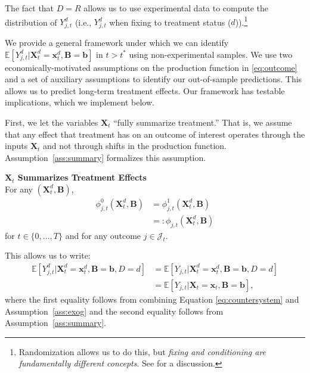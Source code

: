 The fact that $D = R$ allows us to use experimental data to compute the distribution of $Y_{j,t}^d$ (i.e., $Y_{j,t}^d$ when fixing to treatment status ($d$)).\footnote{Randomization allows us to do this, but \textit{fixing and conditioning are fundamentally different concepts}. See \citet{Heckman_Pinto_2015_EconometTheory} for a discussion.}

We provide a general framework under which we can identify $\mathbb{E} \left[ Y_{j,t}^d | \bm{X}_{t}^d = \bm{x}_t^d, \bm{B} = \bm{b}  \right]$ in $t > t^*$ using non-experimental samples. We use two economically-motivated assumptions on the production function in \eqref{eq:outcome} and a set of auxiliary assumptions to identify our out-of-sample predictions. This allows us to predict long-term treatment effects. Our framework has testable implications, which we implement below.

First, we let the variables $\bm{X}_{t}$ ``fully summarize treatment.'' That is, we assume that any effect that treatment has on an outcome of interest operates through the inputs $\bm{X}_{t}$ and not through shifts in the production function. Assumption~\ref{ass:summary} formalizes this assumption.

\begin{assumption} \label{ass:summary} \textbf{$\bm{X}_{t}$ Summarizes Treatment Effects}\\
For any $\left( \bm{X}_{t}^d, \bm{B} \right)$,
\begin{align}
\phi_{j,t}^0 \left( \bm{X}_{t}^d, \bm{B} \right) &= \phi_{j,t}^1 \left( \bm{X}_{t}^d, \bm{B} \right) \\   \nonumber
                                                                     &=: \phi_{j,t} \left( \bm{X}_{t}^d, \bm{B} \right)
\end{align}
\noindent for $t \in \{ 0, \ldots, T \}$ and for any outcome $j \in \mathcal{J}_{t}$.
\end{assumption}
This allows us to write:
\begin{align}
\mathbb{E} \left[ Y_{j,t}^d | \bm{X}_{t}^d  = \bm{x}_{t}^d, \bm{B} = \bm{b}, D = d \right] &=  \mathbb{E} \left[ Y_{j,t} | \bm{X}_{t}^d  = \bm{x}_{t}^d, \bm{B} = \bm{b}, D = d \right] \nonumber\\
&=\mathbb{E} \left[ Y_{j,t} | \bm{X}_{t}  = \bm{x}_{t}, \bm{B} =  \bm{b} \right], \label{eq:invariancetest}
\end{align}
where the first equality follows from combining Equation \eqref{eq:countersystem} and Assumption~\ref{ass:exog} and the second equality follows from  Assumption~\ref{ass:summary}.

